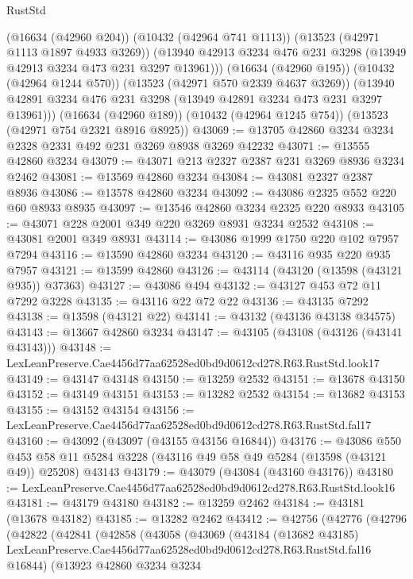 \begin{lexlean}{RustStd}
\begin{coremodule}
        (@16634 (@42960 @204))
        (@10432 (@42964 @741 @1113))
        (@13523 (@42971 @1113 @1897 @4933 @3269))
        (@13940 @42913 @3234 @476 @231 @3298 (@13949 @42913 @3234 @473 @231 @3297 @13961)))
      (@16634 (@42960 @195))
      (@10432 (@42964 @1244 @570))
      (@13523 (@42971 @570 @2339 @4637 @3269))
      (@13940 @42891 @3234 @476 @231 @3298 (@13949 @42891 @3234 @473 @231 @3297 @13961)))
    (@16634 (@42960 @189))
    (@10432 (@42964 @1245 @754))
    (@13523 (@42971 @754 @2321 @8916 @8925))
@43069 := @13705 @42860 @3234 @3234 @2328 @2331 @492 @231 @3269 @8938 @3269 @42232
@43071 := @13555 @42860 @3234
@43079 := @43071 @213 @2327 @2387 @231 @3269 @8936 @3234 @2462
@43081 := @13569 @42860 @3234
@43084 := @43081 @2327 @2387 @8936
@43086 := @13578 @42860 @3234
@43092 := @43086 @2325 @552 @220 @60 @8933 @8935
@43097 := @13546 @42860 @3234 @2325 @220 @8933
@43105 := @43071 @228 @2001 @349 @220 @3269 @8931 @3234 @2532
@43108 := @43081 @2001 @349 @8931
@43114 := @43086 @1999 @1750 @220 @102 @7957 @7294
@43116 := @13590 @42860 @3234
@43120 := @43116 @935 @220 @935 @7957
@43121 := @13599 @42860
@43126 := @43114 (@43120 (@13598 (@43121 @935)) @37363)
@43127 := @43086 @494
@43132 := @43127 @453 @72 @11 @7292 @3228
@43135 := @43116 @22 @72 @22
@43136 := @43135 @7292
@43138 := @13598 (@43121 @22)
@43141 := @43132 (@43136 @43138 @34575)
@43143 := @13667 @42860 @3234
@43147 := @43105 (@43108 (@43126 (@43141 @43143)))
@43148 := LexLeanPreserve.Cae4456d77aa62528ed0bd9d0612cd278.R63.RustStd.look17
@43149 := @43147 @43148
@43150 := @13259 @2532
@43151 := @13678 @43150
@43152 := @43149 @43151
@43153 := @13282 @2532
@43154 := @13682 @43153
@43155 := @43152 @43154
@43156 := LexLeanPreserve.Cae4456d77aa62528ed0bd9d0612cd278.R63.RustStd.fal17
@43160 := @43092 (@43097 (@43155 @43156 @16844))
@43176 := @43086
    @550
    @453
    @58
    @11
    @5284
    @3228
    (@43116 @49 @58 @49 @5284 (@13598 (@43121 @49)) @25208)
    @43143
@43179 := @43079 (@43084 (@43160 @43176))
@43180 := LexLeanPreserve.Cae4456d77aa62528ed0bd9d0612cd278.R63.RustStd.look16
@43181 := @43179 @43180
@43182 := @13259 @2462
@43184 := @43181 (@13678 @43182)
@43185 := @13282 @2462
@43412 := @42756
    (@42776
      (@42796
        (@42822
          (@42841
            (@42858
              (@43058
                (@43069
                  (@43184
                    (@13682 @43185)
                    LexLeanPreserve.Cae4456d77aa62528ed0bd9d0612cd278.R63.RustStd.fal16
                    @16844)
                  (@13923
                    @42860
                    @3234
                    @3234

\end{coremodule}
\end{lexlean}
